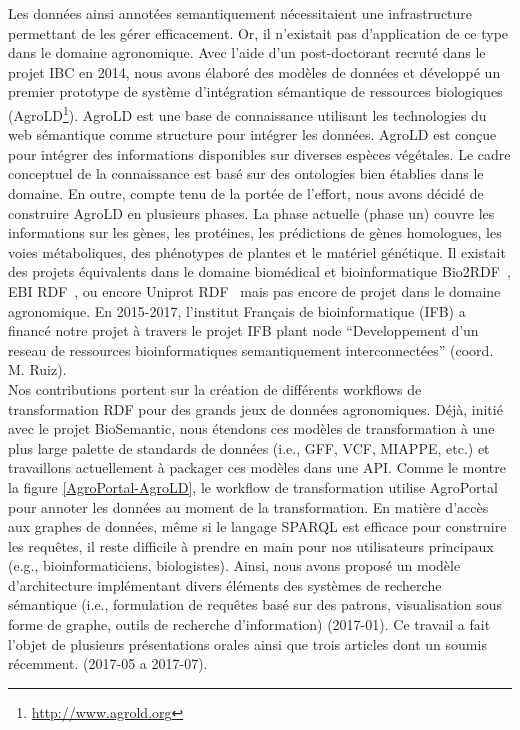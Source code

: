 Les données ainsi annotées semantiquement nécessitaient une infrastructure permettant de les gérer efficacement. Or, il n’existait pas d’application de ce type dans le domaine agronomique. Avec l’aide d’un post-doctorant recruté dans le projet IBC en 2014, nous avons élaboré des modèles de données et développé un premier prototype de système d’intégration sémantique de ressources biologiques (AgroLD\footnote{\url{http://www.agrold.org}}). AgroLD est une base de connaissance utilisant les technologies du web sémantique comme structure pour intégrer les données. AgroLD est conçue pour intégrer des informations disponibles sur diverses espèces végétales. Le cadre conceptuel de la connaissance est basé sur des ontologies bien établies dans le domaine. En outre, compte tenu de la portée de l'effort, nous avons décidé de construire AgroLD en plusieurs phases. La phase actuelle (phase un) couvre les informations sur les gènes, les protéines, les prédictions de gènes homologues, les voies métaboliques, des phénotypes de plantes et le matériel génétique. Il existait des projets équivalents dans le domaine biomédical et bioinformatique Bio2RDF~\cite{Belleau2008a,Callahan2013}, EBI RDF~\cite{Jupp2014}, ou encore Uniprot RDF~\cite{redaschi2009}  mais pas encore de projet dans le domaine agronomique. En 2015-2017, l’institut Français de bioinformatique (IFB) a financé notre projet à travers le projet IFB plant node   “Developpement d’un reseau de ressources bioinformatiques semantiquement interconnectées” (coord. M. Ruiz).\\ 

Nos contributions portent sur la création de différents workflows de transformation RDF pour des grands jeux de données agronomiques. Déjà, initié avec le projet BioSemantic, nous étendons ces modèles de transformation à une plus large palette de standards de données %
(i.e., GFF, VCF, MIAPPE, etc.) et travaillons actuellement à packager ces modèles dans une API. Comme le montre la figure \ref{AgroPortal-AgroLD}, le workflow de transformation utilise AgroPortal pour annoter les données au moment de la transformation. 
En matière d’accès aux graphes de données, même si le langage SPARQL est efficace pour construire les requêtes, il reste difficile à prendre en main pour nos utilisateurs principaux (e.g., bioinformaticiens, biologistes). Ainsi, nous avons proposé un modèle d'architecture implémentant divers éléments des systèmes de recherche sémantique (i.e., formulation de requêtes basé sur des patrons, visualisation sous forme de graphe, outils de recherche d’information) (2017-01).
Ce travail a fait l’objet de plusieurs présentations orales ainsi que trois articles dont un soumis récemment. (2017-05 a 2017-07).

